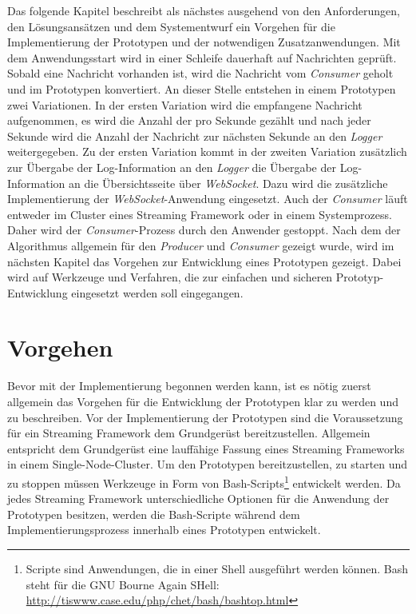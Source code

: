Das folgende Kapitel beschreibt als nächstes ausgehend von den Anforderungen, den Lösungsansätzen und dem Systementwurf ein Vorgehen für die Implementierung der Prototypen und der notwendigen Zusatzanwendungen. Mit dem Anwendungsstart wird in einer Schleife dauerhaft auf Nachrichten geprüft. Sobald eine Nachricht vorhanden ist, wird die Nachricht vom \textit{Consumer} geholt und im Prototypen konvertiert. An dieser Stelle entstehen in einem Prototypen zwei Variationen. In der ersten Variation wird die empfangene Nachricht aufgenommen, es wird die Anzahl der pro Sekunde gezählt und nach jeder Sekunde wird die Anzahl der Nachricht zur nächsten Sekunde an den \textit{Logger} weitergegeben. Zu der ersten Variation kommt in der zweiten Variation zusätzlich zur Übergabe der Log-Information an den \textit{Logger} die Übergabe der Log-Information an die Übersichtsseite über \textit{WebSocket}. Dazu wird die zusätzliche Implementierung der \textit{WebSocket}-Anwendung eingesetzt. Auch der \textit{Consumer} läuft entweder im Cluster eines Streaming Framework oder in einem Systemprozess. Daher wird der \textit{Consumer}-Prozess durch den Anwender gestoppt. Nach dem der Algorithmus allgemein für den \textit{Producer} und \textit{Consumer} gezeigt wurde, wird im nächsten Kapitel das Vorgehen zur Entwicklung eines Prototypen gezeigt. Dabei wird auf Werkzeuge und Verfahren, die zur einfachen und sicheren Prototyp-Entwicklung eingesetzt werden soll eingegangen.


\section{Vorgehen}
\label{sec:vorgehen}

Bevor mit der Implementierung begonnen werden kann, ist es nötig zuerst allgemein das Vorgehen für die Entwicklung der Prototypen klar zu werden und zu beschreiben. Vor der Implementierung der Prototypen sind die Voraussetzung für ein Streaming Framework dem Grundgerüst bereitzustellen. Allgemein entspricht dem Grundgerüst eine lauffähige Fassung eines Streaming Frameworks in einem Single-Node-Cluster. Um den Prototypen bereitzustellen, zu starten und zu stoppen müssen Werkzeuge in Form von Bash-Scripts\footnote{Scripte sind Anwendungen, die in einer Shell ausgeführt werden können. Bash steht für die GNU Bourne Again SHell: \url{http://tiswww.case.edu/php/chet/bash/bashtop.html}} entwickelt werden. Da jedes Streaming Framework unterschiedliche Optionen für die Anwendung der Prototypen besitzen, werden die Bash-Scripte während dem Implementierungsprozess innerhalb eines Prototypen entwickelt.

